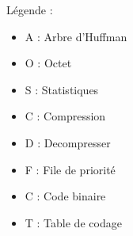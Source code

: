 Légende :
\begin{itemize}
    \item A : Arbre d'Huffman
    \item O : Octet
    \item S : Statistiques
    \item C : Compression
    \item D : Decompresser
    \item F : File de priorité
    \item C : Code binaire
    \item T : Table de codage
\end{itemize}